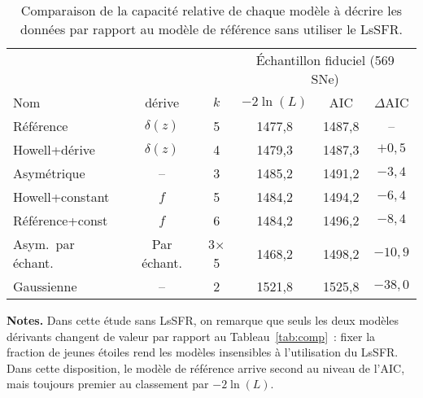 \documentclass[../main/main.tex]{subfiles}
\begin{document}
\begin{table}[ht]
    \centerfloat
    \begin{threeparttable}
        \caption[Comparaison de la capacité relative de chaque modèle à décrire
        les données par rapport au modèle de référence sans utiliser le
        LsSFR]{Comparaison de la capacité relative de chaque modèle à décrire
            les données par rapport au modèle de référence sans utiliser le
        LsSFR.}\label{tab:comp_zonly}
        \begin{tabular}{lccccc}
            \toprule
            & & & \multicolumn{3}{c}{Échantillon fiduciel (569 SNe)} \\
            \cmidrule(lr){4-6}
            Nom & dérive & $k$ &
            $-2\ln(L)$ & AIC & $\Delta$AIC\\
            \midrule
            Référence & $\delta(z)$ & 5
            & 1477,8 & 1487,8 & --
            \\
            Howell+dérive & $\delta(z)$ & 4
            & 1479,3 & 1487,3 & $+0,5$
            \\
            Asymétrique & -- & 3
            & 1485,2 & 1491,2 & $-3,4$
            \\
            Howell+constant & $f$ & 5
            & 1484,2 & 1494,2 & $-6,4$
            \\
            Référence+const & $f$ & 6
            & 1484,2 & 1496,2 & $-8,4$
            \\
            Asym.\ par échant. & Par échant. & 3$\times$5
            & 1468,2 & 1498,2  & $-10,9$
            \\
            Gaussienne & -- & 2
            & 1521,8 & 1525,8 & $-38,0$
            \\
            \bottomrule
        \end{tabular}
        \begin{tablenotes}[flushleft]
            \item \textbf{\hspace{-3.2pt}Notes.} Dans cette étude sans LsSFR, on
                remarque que seuls les deux modèles dérivants changent de valeur
                par rapport au Tableau~\ref{tab:comp}~: fixer la fraction de
                jeunes étoiles rend les modèles insensibles à l'utilisation du
                LsSFR. Dans cette disposition, le modèle de référence arrive
                second au niveau de l'AIC, mais toujours premier au classement
                par $-2\ln(L)$.
        \end{tablenotes}
    \end{threeparttable}
\end{table}
\end{document}
